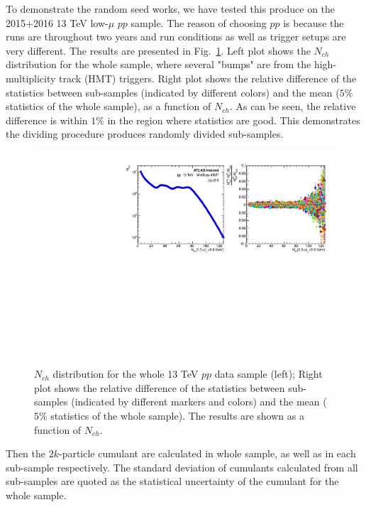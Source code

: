 To demonstrate the random seed works, we have tested this produce on the 2015+2016 13 TeV low-$\mu$ $pp$ sample. The reason of choosing $pp$ is because the runs are throughout two years and run conditions as well as trigger setups are very different. The results are presented in Fig.~\ref{fig:ana_div}. Left plot shows the $N_{ch}$ distribution for the whole sample, where several "bumps" are from the high-multiplicity track (HMT) triggers. Right plot shows the relative difference of the statistics between sub-samples (indicated by different colors) and the mean ($5\%$ statistics of the whole sample), as a function of $N_{ch}$. As can be seen, the relative difference is within $1\%$ in the region where statistics are good. This demonstrates the dividing procedure produces randomly divided sub-samples.
\begin{figure}[H]
\centering
\includegraphics[width=.9\linewidth]{figs/sec_ana/pp13_chk_division.pdf}
\caption{$N_{ch}$ distribution for the whole 13 TeV $pp$ data sample (left); Right plot shows the relative difference of the statistics between sub-samples (indicated by different markers and colors) and the mean ($5\%$ statistics of the whole sample). The results are shown as a function of $N_{ch}$.}
\label{fig:ana_div}
\end{figure}

Then the $2k$-particle cumulant are calculated in whole sample, as well as in each sub-sample respectively. The standard deviation of cumulants calculated from all sub-samples are quoted as the statistical uncertainty of the cumulant for the whole sample.


